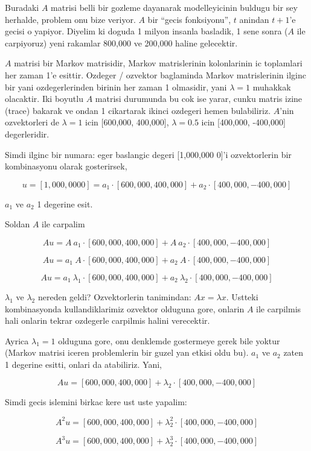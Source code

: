 \documentclass[12pt,fleqn]{article}
\begin{document}
Buradaki $A$ matrisi belli bir gozleme dayanarak modelleyicinin buldugu bir
sey herhalde, problem onu bize veriyor. $A$ bir ``gecis fonksiyonu'', $t$
anindan $t+1$'e gecisi o yapiyor. Diyelim ki doguda 1 milyon insanla
basladik, 1 sene sonra ($A$ ile carpiyoruz) yeni rakamlar 800,000 ve
200,000 haline gelecektir. 

$A$ matrisi bir Markov matrisidir, Markov matrislerinin kolonlarinin ic
toplamlari her zaman 1'e esittir. Ozdeger / ozvektor baglaminda Markov
matrislerinin ilginc bir yani ozdegerlerinden birinin her zaman 1
olmasidir, yani $\lambda = 1$ muhakkak olacaktir. Iki boyutlu $A$ matrisi
durumunda bu cok ise yarar, cunku matris izine (trace) bakarak ve ondan 1
cikartarak ikinci ozdegeri hemen bulabiliriz. $A$'nin ozvektorleri de
$\lambda = 1$ icin [600,000, 400,000], $\lambda = 0.5$ icin [400,000, -400,000]
degerleridir. 

Simdi ilginc bir numara: eger baslangic degeri [1,000,000 0]'i ozvektorlerin
bir kombinasyonu olarak gosterirsek,

\[ u = [1,000,000 0] = 
a_1 \cdot [600,000, 400,000] + 
a_2 \cdot [400,000, -400,000] \]

$a_1$ ve $a_2$ 1 degerine esit. 

Soldan $A$ ile carpalim

\[ Au = 
A \ a_1 \cdot [600,000, 400,000] + 
A \ a_2 \cdot [400,000, -400,000] \]

\[ Au = 
 a_1 \ A \cdot [600,000, 400,000] + 
 a_2 \ A \cdot [400,000, -400,000] \]

\[ Au = 
a_1 \ \lambda_1 \cdot [600,000, 400,000] + 
a_2 \ \lambda_2 \cdot [400,000, -400,000] \]

$\lambda_1$ ve $\lambda_2$ nereden geldi? Ozvektorlerin tanimindan: $Ax =
\lambda x$. Ustteki 
kombinasyonda kullandiklarimiz ozvektor olduguna gore, onlarin $A$ ile
carpilmis hali onlarin tekrar ozdegerle carpilmis halini verecektir. 

Ayrica $\lambda_1=1$ olduguna gore, onu denklemde gostermeye gerek bile
yoktur (Markov matrisi iceren problemlerin bir guzel yan etkisi oldu
bu). $a_1$ ve $a_2$ zaten 1 degerine esitti, onlari da atabiliriz. Yani,

\[ Au = 
[600,000, 400,000] + 
\lambda_2 \cdot [400,000, -400,000] \]

Simdi gecis islemini birkac kere ust uste yapalim:

\[ A^2u = 
[600,000, 400,000] + 
\lambda_2^2 \cdot [400,000, -400,000] \]

\[ A^3u = 
[600,000, 400,000] + 
\lambda_2^3 \cdot [400,000, -400,000] \]
\end{document}
